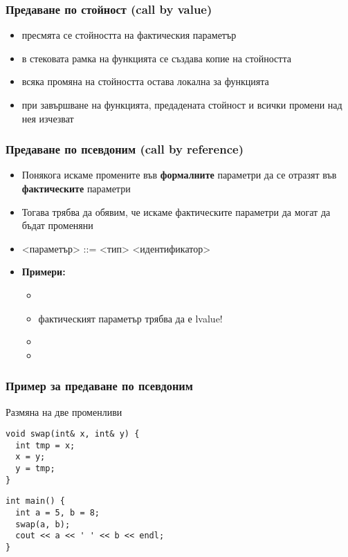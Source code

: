\documentclass[alsotrans]{beamerswitch}
\begin{document}
\begin{frame}
  \frametitle{Предаване по стойност (call by value)}

  \begin{itemize}[<+->]
  \item пресмята се стойността на фактическия параметър
  \item в стековата рамка на функцията се създава \alert{копие} на стойността
  \item всяка промяна на стойността остава локална за функцията
  \item при завършване на функцията, предадената стойност и всички промени над нея \alert{изчезват}
  \end{itemize}
\end{frame}

\begin{frame}
  \frametitle{Предаване по псевдоним (call by reference)}

  \begin{itemize}[<+->]
  \item Понякога искаме промените във \textbf{формалните} параметри
    да се отразят във \textbf{фактическите} параметри
  \item Тогава трябва да обявим, че искаме фактическите параметри да могат да бъдат променяни
  \item{} <параметър> ::= <тип>\tta{\&} <идентификатор>
  \item \textbf{Примери:}
    \begin{itemize}
    \item {}
    \item \alert{фактическият параметър трябва да е lvalue!}
    \item {}
    \item {}
    \end{itemize}
  \end{itemize}
\end{frame}

\begin{frame}[fragile]
  \frametitle{Пример за предаване по псевдоним}

  Размяна на две променливи
\begin{lstlisting}
void swap(int& x, int& y) {
  int tmp = x;
  x = y;
  y = tmp;
}
\end{lstlisting}
\pause
\begin{lstlisting}
int main() {
  int a = 5, b = 8;
  swap(a, b);
  cout << a << ' ' << b << endl;
}
\end{lstlisting}
\end{frame}
\end{document}
